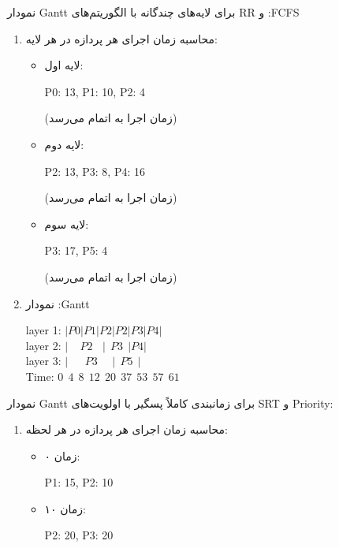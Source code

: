 \begin{qsolve}
	نمودار Gantt برای لایه‌های چندگانه با الگوریتم‌های RR و :FCFS
	\begin{enumerate}
		\item محاسبه زمان اجرای هر پردازه در هر لایه:
		\begin{itemize}
			\item لایه اول: \\
			\begin{latin}
				P0: 13, P1: 10, P2: 4 
			\end{latin} (زمان اجرا به اتمام می‌رسد)
			
			\item لایه دوم: \\
			\begin{latin}
			P2: 13, P3: 8, P4: 16
			\end{latin} (زمان اجرا به اتمام می‌رسد)
			
			\item لایه سوم: \\
			\begin{latin}
			P3: 17, P5: 4
			\end{latin} (زمان اجرا به اتمام می‌رسد)
		\end{itemize}
		
		
		\item نمودار :Gantt
		\begin{latin}
			layer 1: $| P0 | P1 | P2 | P2 | P3 | P4 |$ \\
			layer 2: $|\ \ \ \ \ P2 \ \ \ \ |\ \ P3 \ \ | P4 |$ \\ 
			layer 3: $|\ \ \ \ \ \ \ P3 \ \ \ \ \ \ |\ \ P5 \ \ |$ \\
			Time:  $ 0 \ \ 4 \ \ 8 \ \ 12 \ \ 20 \ \ 37 \ \ 53 \ \ 57 \ \ 61 $
		\end{latin}
	\end{enumerate}
	
	
	نمودار Gantt برای زمانبندی کاملاً پسگیر با اولویت‌های SRT و Priority:
	\begin{enumerate}
		\item محاسبه زمان اجرای هر پردازه در هر لحظه:
		\begin{itemize}
			\item زمان ۰: \\
			\begin{latin}
				P1: 15, P2: 10
			\end{latin}
			
			\item زمان ۱۰: \\
			\begin{latin}
				P2: 20, P3: 20
			\end{latin}
			

\end{itemize}
\end{enumerate}
\end{qsolve}
